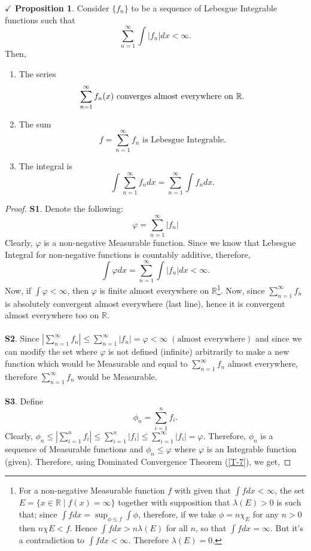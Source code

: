 \documentclass{article}
\theoremstyle{definition}
\theoremstyle{remark}
\theoremstyle{definition}
\theoremstyle{definition}
\newtheorem{proposition}{$\checkmark$ Proposition}
\theoremstyle{definition}
\newcommand{\abs}[1]{\left \vert #1\right \vert}
\newcommand{\where}{\;\vert\;}
\newcommand{\R}{\mathbb{R}}
\newcommand{\lm}[1]{\lambda\left (#1\right )}
\begin{document}
\hrulefill
\newpage
\begin{proposition}
	Consider $ \{f_n\} $ to be a sequence of Lebesgue Integrable functions such that
	\[\sum_{n=1}^{\infty} \int \abs{f_n}dx < \infty.\]
	Then, 
	\begin{enumerate}
		\item {The series
		\[\sum_{n=1}^{\infty} f_n(x) \text{ converges almost everywhere on $ \R $.}\]}
	\item {The sum
\[f = \sum_{n=1}^{\infty}f_n\text{ is Lebesgue Integrable.}\]	
}
\item {The integral is
\[\int \sum_{n=1}^{\infty}f_ndx = \sum_{n=1}^{\infty} \int f_n dx.\]
}
	\end{enumerate}
\end{proposition}
\begin{proof}
	\textbf{S1}. Denote the following:
	\[\varphi = \sum_{n=1}^{\infty} \abs{f_n}\]
	Clearly, $ \varphi $ is a non-negative Measurable function. Since we know that Lebesgue Integral for non-negative functions is countably additive, therefore,
	\[\int \varphi dx = \sum_{n=1}^{\infty} \int \abs{f_n} dx < \infty.\]
	Now, if $ \int \varphi < \infty$, then $ \varphi $ is finite almost everywhere on $ \R $\footnote{For a non-negative Measurable function $ f $ with given that $ \int fdx < \infty $, the set $ E =\{x\in \R\where f(x) = \infty\} $ together with supposition that $ \lm{E} > 0 $ is such that; since $ \int fdx = \sup_{\phi \le f} \int \phi $, therefore, if we take $ \phi = n\chi_{E} $ for any $ n > 0$ then $ n\chi{E} < f$. Hence $ \int fdx > n\lm{E} $ for all $ n $, so that $ \int fdx = \infty $. But it's a contradiction to $ \int fdx <\infty $. Therefore $ \lm{E} = 0 $.}. Now, since $ \sum_{n=1}^{\infty}f_n $ is absolutely convergent almost everywhere (last line), hence it is convergent almost everywhere too on $ \R $.\\\\
	\textbf{S2}. Since $ \abs{\sum_{n=1}^{\infty} f_n} \le \sum_{n=1}^{\infty} \abs{f_n} = \varphi < \infty \;(\text{almost everywhere})$ and since we can modify the set where $ \varphi $ is not defined (infinite) arbitrarily to make a new function which would be Measurable and equal to $ \sum_{n=1}^{\infty} f_n $ almost everywhere, therefore $ \sum_{n=1}^{\infty}f_n $ would be Measurable.\\\\
	\textbf{S3}. Define
	\[\phi_{n} = \sum_{i=1}^{n} f_i.\]
	Clearly, $ \phi_{n} \le \abs{\sum_{i=1}^{n}f_i} \le \sum_{i=1}^{n} \abs{f_i} \le \sum_{i=1}^{\infty} \abs{f_i} = \varphi$. Therefore, $ \phi_n $ is a sequence of Measurable functions and $ \phi_n \le \varphi $ where $ \varphi $ is an Integrable function (given). Therefore, using Dominated Convergence Theorem (\ref{T-7}), we get, 

\end{proof}
\end{document}

